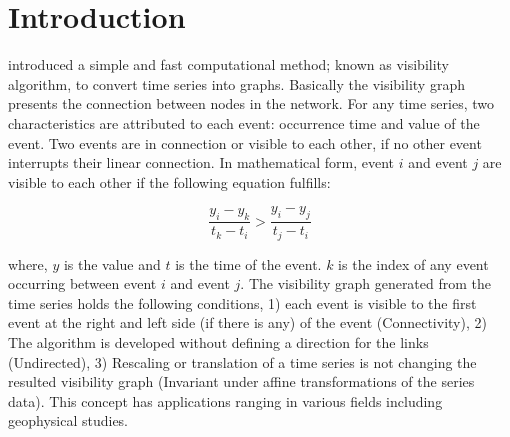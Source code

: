
\section{Introduction}
\noindent
\citet{Lacasa2008} introduced a simple and fast computational method; known as visibility algorithm, to convert time series into graphs. Basically the visibility graph presents the connection between nodes in the network. For any time series, two characteristics are attributed to each event: occurrence time and value of the event. Two events are in connection or visible to each other, if no other event interrupts their linear connection. In mathematical form, event $i$ and event $j$ are visible to each other if the following equation fulfills:

\begin{equation}
\frac{y_i - y_k }{t_k - t_i} > \frac{y_i - y_j}{ t_j - t_i} 
\end{equation}

\noindent
where, $y$ is the value and $t$ is the time of the event. $k$ is the index of any event occurring between event $i$ and event $j$. The visibility graph generated from the time series holds the following conditions, 1) each event is visible to the first event at the right and left side (if there is any) of the event  (Connectivity), 2) The algorithm is developed without defining a direction for the links (Undirected),  3) Rescaling or translation of a time series is not changing the resulted visibility graph (Invariant under affine transformations of  the series data)\citep{Lacasa2008}. This concept has applications ranging in various fields including geophysical studies.

